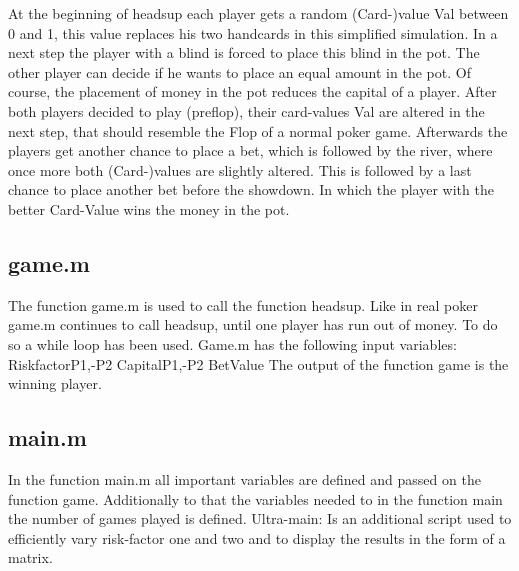 \documentclass[11pt]{article}
\begin{document}
At the beginning of headsup each player gets a random (Card-)value Val between 0 and 1, this value replaces his two handcards in this simplified simulation. In a next step the player with a blind is forced to place this blind in the pot. The other player can decide if he wants to place an equal amount in the pot.  Of course, the placement of money in the pot reduces the capital of a player. After both players decided to play (preflop), their card-values Val are altered in the next step, that should resemble the Flop of a normal poker game. Afterwards the players get another chance to place a bet, which is followed by the river, where once more both (Card-)values are slightly altered. This is followed by a last chance to place another bet before the showdown. In which the player with the better Card-Value wins the money in the pot.

\subsection{game.m}
The function game.m is used to call the function headsup. Like in real poker game.m continues to call headsup, until one player has run out of money. To do so a while loop has been used. Game.m has the following input variables:
RiskfactorP1,-P2
CapitalP1,-P2
BetValue
The output of the function game is the winning player.
\subsection{main.m}
In the function main.m all important variables are defined and passed on the function game.
Additionally to that the variables needed to in the function main the number of games played is defined.
Ultra-main: Is an additional script used to efficiently vary risk-factor one and two and to display the results in the form of a matrix.
\end{document}
